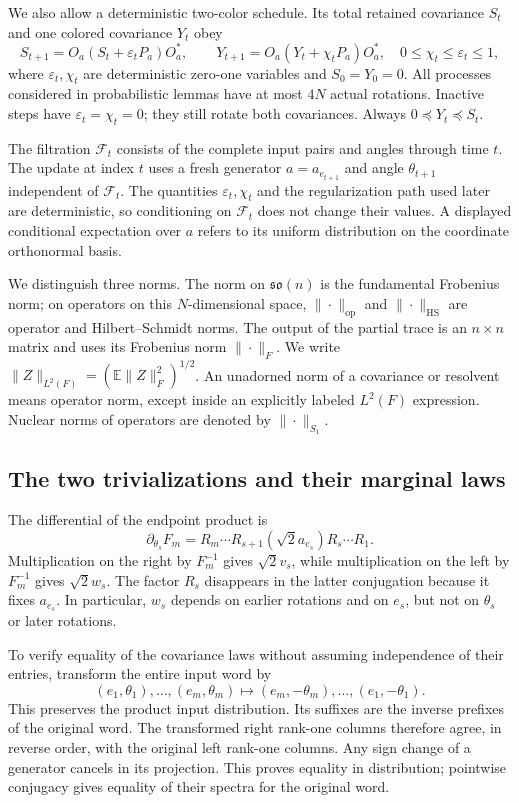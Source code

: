 \documentclass[11pt]{article}
\theoremstyle{definition}\newtheorem{definition}[theorem]{Definition}
\theoremstyle{remark}\newtheorem{remark}[theorem]{Remark}
\newcommand{\E}{\mathbb E}
\newcommand{\op}{\mathrm{op}}
\newcommand{\HS}{\mathrm{HS}}
\begin{document}
We also allow a deterministic two-color schedule. Its total retained covariance $S_t$ and one colored covariance $Y_t$ obey
\begin{equation}\label{eq:colored}
 S_{t+1}=O_a(S_t+\varepsilon_tP_a)O_a^*,\qquad
 Y_{t+1}=O_a(Y_t+\chi_tP_a)O_a^*,
 \quad 0\le\chi_t\le\varepsilon_t\le1,
\end{equation}
where $\varepsilon_t,\chi_t$ are deterministic zero-one variables and $S_0=Y_0=0$. All processes considered in probabilistic lemmas have at most $4N$ actual rotations. Inactive steps have $\varepsilon_t=\chi_t=0$; they still rotate both covariances. Always $0\preceq Y_t\preceq S_t$.


The filtration $\mathcal F_t$ consists of the complete input pairs and angles through time $t$. The update at index $t$ uses a fresh generator $a=a_{e_{t+1}}$ and angle $\theta_{t+1}$ independent of $\mathcal F_t$. The quantities $\varepsilon_t,\chi_t$ and the regularization path used later are deterministic, so conditioning on $\mathcal F_t$ does not change their values. A displayed conditional expectation over $a$ refers to its uniform distribution on the coordinate orthonormal basis.

We distinguish three norms. The norm on $\mathfrak{so}(n)$ is the fundamental Frobenius norm; on operators on this $N$-dimensional space, $\|\cdot\|_{\op}$ and $\|\cdot\|_{\HS}$ are operator and Hilbert--Schmidt norms. The output of the partial trace is an $n\times n$ matrix and uses its Frobenius norm $\|\cdot\|_F$. We write $\|Z\|_{L^2(F)}=(\E\|Z\|_F^2)^{1/2}$. An unadorned norm of a covariance or resolvent means operator norm, except inside an explicitly labeled $L^2(F)$ expression. Nuclear norms of operators are denoted by $\|\cdot\|_{S_1}$.

\subsection{The two trivializations and their marginal laws}
The differential of the endpoint product is
\[
 \partial_{\theta_s}F_m
 =R_m\cdots R_{s+1}(\sqrt2a_{e_s})R_s\cdots R_1.
\]
Multiplication on the right by $F_m^{-1}$ gives $\sqrt2v_s$, while multiplication on the left by $F_m^{-1}$ gives $\sqrt2w_s$. The factor $R_s$ disappears in the latter conjugation because it fixes $a_{e_s}$. In particular, $w_s$ depends on earlier rotations and on $e_s$, but not on $\theta_s$ or later rotations.

To verify equality of the covariance laws without assuming independence of their entries, transform the entire input word by
\[
 (e_1,\theta_1),\ldots,(e_m,\theta_m)
 \longmapsto (e_m,-\theta_m),\ldots,(e_1,-\theta_1).
\]
This preserves the product input distribution. Its suffixes are the inverse prefixes of the original word. The transformed right rank-one columns therefore agree, in reverse order, with the original left rank-one columns. Any sign change of a generator cancels in its projection. This proves equality in distribution; pointwise conjugacy gives equality of their spectra for the original word.
\end{document}
